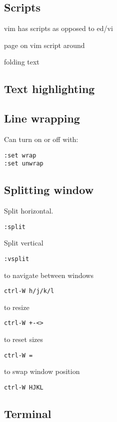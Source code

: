 
\subsection{Scripts}

vim has scripts as opposed to ed/vi

page on vim script around

folding text

\subsection{Text highlighting}

\subsection{Line wrapping}

Can turn on or off with:

\begin{verbatim}
:set wrap
:set unwrap
\end{verbatim}


\subsection{Splitting window}

Split horizontal.
\begin{verbatim}
:split
\end{verbatim}

Split vertical
\begin{verbatim}
:vsplit
\end{verbatim}


to navigate between windows
\begin{verbatim}
ctrl-W h/j/k/l
\end{verbatim}

to resize
\begin{verbatim}
ctrl-W +-<>
\end{verbatim}

to reset sizes
\begin{verbatim}
ctrl-W =
\end{verbatim}

to swap window position
\begin{verbatim}
ctrl-W HJKL
\end{verbatim}


\subsection{Terminal}

